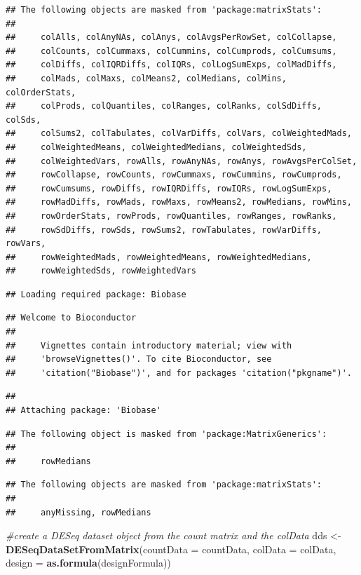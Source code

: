 \documentclass[
]{article}
\newenvironment{Shaded}{\begin{snugshade}}{\end{snugshade}}
\newcommand{\AttributeTok}[1]{\textcolor[rgb]{0.13,0.29,0.53}{#1}}
\newcommand{\CommentTok}[1]{\textcolor[rgb]{0.56,0.35,0.01}{\textit{#1}}}
\newcommand{\FunctionTok}[1]{\textcolor[rgb]{0.13,0.29,0.53}{\textbf{#1}}}
\newcommand{\NormalTok}[1]{#1}
\newcommand{\OtherTok}[1]{\textcolor[rgb]{0.56,0.35,0.01}{#1}}
\begin{document}
\begin{verbatim}
## The following objects are masked from 'package:matrixStats':
## 
##     colAlls, colAnyNAs, colAnys, colAvgsPerRowSet, colCollapse,
##     colCounts, colCummaxs, colCummins, colCumprods, colCumsums,
##     colDiffs, colIQRDiffs, colIQRs, colLogSumExps, colMadDiffs,
##     colMads, colMaxs, colMeans2, colMedians, colMins, colOrderStats,
##     colProds, colQuantiles, colRanges, colRanks, colSdDiffs, colSds,
##     colSums2, colTabulates, colVarDiffs, colVars, colWeightedMads,
##     colWeightedMeans, colWeightedMedians, colWeightedSds,
##     colWeightedVars, rowAlls, rowAnyNAs, rowAnys, rowAvgsPerColSet,
##     rowCollapse, rowCounts, rowCummaxs, rowCummins, rowCumprods,
##     rowCumsums, rowDiffs, rowIQRDiffs, rowIQRs, rowLogSumExps,
##     rowMadDiffs, rowMads, rowMaxs, rowMeans2, rowMedians, rowMins,
##     rowOrderStats, rowProds, rowQuantiles, rowRanges, rowRanks,
##     rowSdDiffs, rowSds, rowSums2, rowTabulates, rowVarDiffs, rowVars,
##     rowWeightedMads, rowWeightedMeans, rowWeightedMedians,
##     rowWeightedSds, rowWeightedVars
\end{verbatim}

\begin{verbatim}
## Loading required package: Biobase
\end{verbatim}

\begin{verbatim}
## Welcome to Bioconductor
## 
##     Vignettes contain introductory material; view with
##     'browseVignettes()'. To cite Bioconductor, see
##     'citation("Biobase")', and for packages 'citation("pkgname")'.
\end{verbatim}

\begin{verbatim}
## 
## Attaching package: 'Biobase'
\end{verbatim}

\begin{verbatim}
## The following object is masked from 'package:MatrixGenerics':
## 
##     rowMedians
\end{verbatim}

\begin{verbatim}
## The following objects are masked from 'package:matrixStats':
## 
##     anyMissing, rowMedians
\end{verbatim}

\begin{Shaded}
\begin{Highlighting}[]
\CommentTok{\#create a DESeq dataset object from the count matrix and the colData }
\NormalTok{dds }\OtherTok{\textless{}{-}} \FunctionTok{DESeqDataSetFromMatrix}\NormalTok{(}\AttributeTok{countData =}\NormalTok{ countData, }
                              \AttributeTok{colData =}\NormalTok{ colData, }
                              \AttributeTok{design =} \FunctionTok{as.formula}\NormalTok{(designFormula))}
\end{Highlighting}
\end{Shaded}
\end{document}
